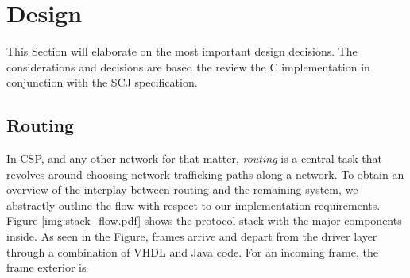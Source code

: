 \section{Design}
This Section will elaborate on the most important design decisions. The considerations and decisions are based the review the C implementation in conjunction with the SCJ specification.

\subsection{Routing}
In CSP, and any other network for that matter, \textit{routing} is a central task that revolves around choosing network trafficking paths along a network. To obtain an overview of the interplay between routing and the remaining system, we abstractly outline the flow with respect to our implementation requirements. Figure \ref{img:stack_flow.pdf} shows the protocol stack with the major components inside. As seen in the Figure, frames arrive and depart from the driver layer through a combination of VHDL and Java code. For an incoming frame, the frame exterior is 

